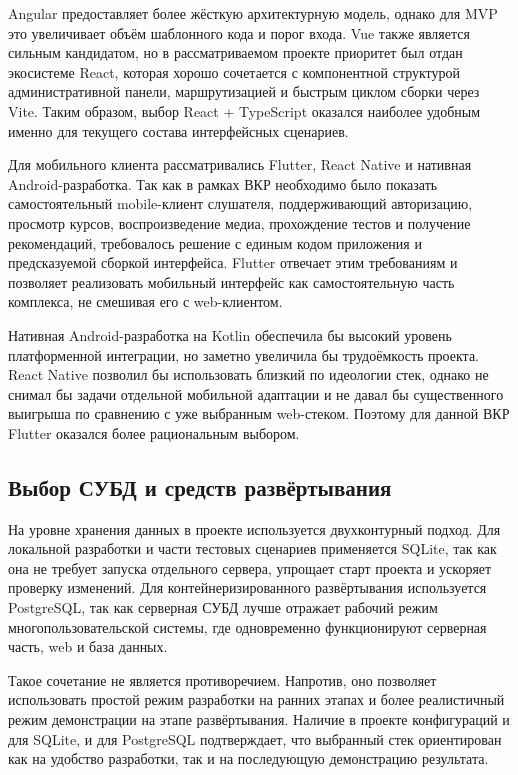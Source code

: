 Angular предоставляет более жёсткую архитектурную модель, однако для MVP это увеличивает объём шаблонного кода и порог входа. Vue также является сильным кандидатом, но в рассматриваемом проекте приоритет был отдан экосистеме React, которая хорошо сочетается с компонентной структурой административной панели, маршрутизацией и быстрым циклом сборки через Vite. Таким образом, выбор React + TypeScript оказался наиболее удобным именно для текущего состава интерфейсных сценариев.

Для мобильного клиента рассматривались Flutter, React Native и нативная Android-разработка. Так как в рамках ВКР необходимо было показать самостоятельный mobile-клиент слушателя, поддерживающий авторизацию, просмотр курсов, воспроизведение медиа, прохождение тестов и получение рекомендаций, требовалось решение с единым кодом приложения и предсказуемой сборкой интерфейса. Flutter отвечает этим требованиям и позволяет реализовать мобильный интерфейс как самостоятельную часть комплекса, не смешивая его с web-клиентом\cite{flutter_docs}.

Нативная Android-разработка на Kotlin обеспечила бы высокий уровень платформенной интеграции, но заметно увеличила бы трудоёмкость проекта. React Native позволил бы использовать близкий по идеологии стек, однако не снимал бы задачи отдельной мобильной адаптации и не давал бы существенного выигрыша по сравнению с уже выбранным web-стеком. Поэтому для данной ВКР Flutter оказался более рациональным выбором.

\subsection{Выбор СУБД и средств развёртывания}

На уровне хранения данных в проекте используется двухконтурный подход. Для локальной разработки и части тестовых сценариев применяется SQLite, так как она не требует запуска отдельного сервера, упрощает старт проекта и ускоряет проверку изменений. Для контейнеризированного развёртывания используется PostgreSQL, так как серверная СУБД лучше отражает рабочий режим многопользовательской системы, где одновременно функционируют серверная часть, web и база данных\cite{sqlite_docs,postgresql_docs}.

Такое сочетание не является противоречием. Напротив, оно позволяет использовать простой режим разработки на ранних этапах и более реалистичный режим демонстрации на этапе развёртывания. Наличие в проекте конфигураций и для SQLite, и для PostgreSQL подтверждает, что выбранный стек ориентирован как на удобство разработки, так и на последующую демонстрацию результата.

